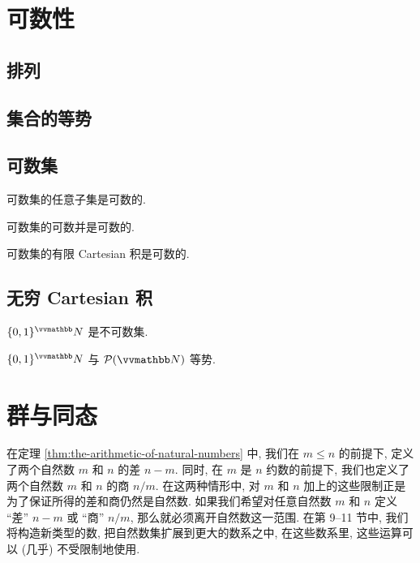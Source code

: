 \section{可数性}

\subsection{排列}

\subsection{集合的等势}

\subsection{可数集}

\begin{proposition}\label{prop:subset-of-countable-set-is-countable}
    可数集的任意子集是可数的.
\end{proposition}

\begin{proposition}
    可数集的可数并是可数的.
\end{proposition}

\begin{proposition}\label{prop:finite-product-of-countable-set-is-countable}
    可数集的有限 Cartesian 积是可数的.
\end{proposition}

\subsection{无穷 Cartesian 积}

\begin{proposition}\label{prop:infinite-product-of-countable-set-is-uncountable}
    \(\{0, 1\}^\N\) 是不可数集.
\end{proposition}

\begin{corollary}
    \(\{0, 1\}^\N\) 与 \(\power(\N)\) 等势.
\end{corollary}

\newpage

\section{群与同态}

在定理 \ref{thm:the-arithmetic-of-natural-numbers} 中, 我们在 \(m \leq n\) 的前提下, 定义了两个自然数 \(m\) 和 \(n\) 的差 \(n-m\). 同时, 在 \(m\) 是 \(n\) 约数的前提下, 我们也定义了两个自然数 \(m\) 和 \(n\) 的商 \(n / m\). 在这两种情形中, 对 \(m\) 和 \(n\) 加上的这些限制正是为了保证所得的差和商仍然是自然数. 如果我们希望对任意自然数 \(m\) 和 \(n\) 定义 ``差'' \(n-m\) 或 ``商'' \(n / m\), 那么就必须离开自然数这一范围. 在第 9--11 节中, 我们将构造新类型的数, 把自然数集扩展到更大的数系之中, 在这些数系里, 这些运算可以 (几乎) 不受限制地使用.

